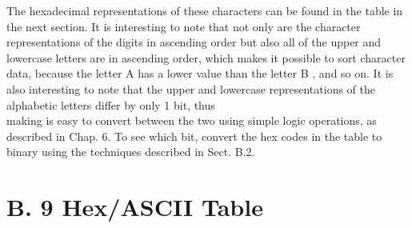 \documentclass[10pt]{article}
\begin{document}
The hexadecimal representations of these characters can be found in the table in the next section. It is interesting to note that not only are the character representations of the digits in ascending order but also all of the upper and lowercase letters are in ascending order, which makes it possible to sort character data, because the letter A has a lower value than the letter B , and so on. It is also interesting to note that the upper and lowercase representations of the alphabetic letters differ by only 1 bit, thus\\
making is easy to convert between the two using simple logic operations, as described in Chap. 6. To see which bit, convert the hex codes in the table to binary using the techniques described in Sect. B.2.

\section*{B. 9 Hex/ASCII Table}
\end{document}
